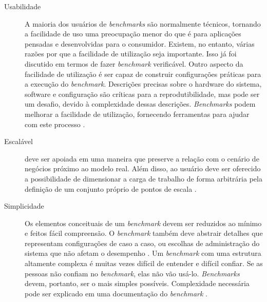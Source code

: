 \begin{description}
	\item[Usabilidade] A maioria dos usuários de \textit{benchmarks} são normalmente técnicos, tornando a facilidade de uso uma preocupação menor do que é para aplicações pensadas e desenvolvidas para o consumidor. Existem, no entanto, várias razões por que a facilidade de utilização seja importante.
	Isso já foi discutido em termos de fazer \textit{benchmark} verificável. Outro aspecto da facilidade de utilização é ser capaz de construir configurações práticas para a execução do \textit{benchmark}. Descrições precisas sobre o hardware do sistema, software e configuração são críticas para a reprodutibilidade, mas pode ser um desafio, devido à complexidade dessas descrições.
	\textit{Benchmarks} podem melhorar a facilidade de utilização, fornecendo ferramentas para ajudar com este processo \cite{Kistowski2015}. 
	
	\item[Escalável] deve ser apoiada em uma maneira que preserve a relação com o cenário de negócios próximo ao modelo real. Além disso, ao usuário deve ser oferecido a possibilidade de dimensionar a carga de trabalho de forma arbitrária pela definição de um conjunto próprio de pontos de escala \cite{Marco2012}. 
	
	\item[Simplicidade] Os elementos conceituais de um \textit{benchmark} devem ser reduzidos ao mínimo e feitos fácil compreensão. O \textit{benchmark} também deve abstrair detalhes que representam configurações de caso a caso, ou escolhas de administração do sistema que não afetam o desempenho \cite{Chen2014}. Um \textit{benchmark} com uma estrutura altamente complexa é muitas vezes difícil de entender e difícil confiar. Se as pessoas não confiam no \textit{benchmark}, elas não vão usá-lo. \textit{Benchmarks} devem, portanto, ser o mais simples possíveis. Complexidade necessária pode ser explicado em uma documentação do \textit{benchmark} \cite{Weber2014}.
	

\end{description}
